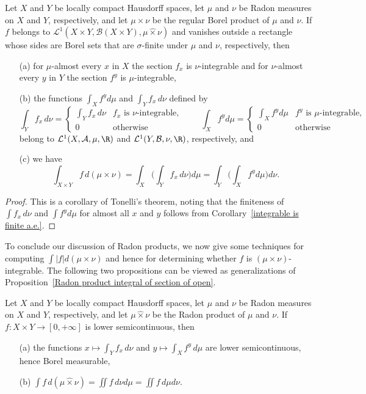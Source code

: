 \begin{proposition}
Let $X$ and $Y$ be locally compact Hausdorff spaces, let $\mu$ and $\nu$ be Radon measures on $X$ and $Y$, respectively, and let $\mu\times\nu$ be the regular Borel product of $\mu$ and $\nu$. If $f$ belongs to $\mathcal{L}^1(X\times Y,\mathcal{B}(X\times Y),\mu\hat{\times}\nu)$ and vanishes outside a rectangle whose sides are Borel sets that are $\sigma$-finite under $\mu$ and $\nu$, respectively, then
\begin{itemize}
\item[(a)] for $\mu$-almost every $x$ in $X$ the section $f_x$ is $\nu$-integrable and for $\nu$-almost every $y$ in $Y$ the section $f^y$ is $\mu$-integrable,
\item[(b)] the functions $\int_Xf^yd\mu$ and $\int_Yf_x\,d\nu$ defined by
\[\int_Yf_x\,d\nu=\begin{cases}
\int_Yf_x\,d\nu&\text{$f_x$ is $\nu$-integrable},\\[8pt]
0&\text{otherwise}
\end{cases}\quad\quad\int_Xf^yd\mu=\begin{cases}
\int_Xf^yd\mu&\text{$f^y$ is $\mu$-integrable},\\[8pt]
0&\text{otherwise}
\end{cases}\]
belong to $\mathcal{L}^1(X,\mathcal{A},\mu,\R)$ and $\mathcal{L}^1(Y,\mathcal{B},\nu,\R)$, respectively, and
\item[(c)] we have
\[\int_{X\times Y}f\,d(\mu\times\nu)=\int_X\Big(\int_Yf_x\,d\nu\Big)d\mu=\int_Y\Big(\int_Xf^yd\mu\Big)d\nu.\]
\end{itemize}
\end{proposition}
\begin{proof}
This is a corollary of Tonelli's theorem, noting that the finiteness of $\int f_x\,d\nu$ and $\int f^yd\mu$ for almost all $x$ and $y$ follows from Corollary~\ref{integrable is finite a.e.}.
\end{proof}
To conclude our discussion of Radon products, we now give some techniques for computing $\int|f|d(\mu\times\nu)$ and hence for determining whether $f$ is $(\mu\times\nu)$-integrable. The following two propositions can be viewed as generalizations of Proposition~\ref{Radon product integral of section of open}.
\begin{proposition}\label{Radon product nonnegative LSC integrable iff}
Let $X$ and $Y$ be locally compact Hausdorff spaces, let $\mu$ and $\nu$ be Radon measures on $X$ and $Y$, respectively, and let $\mu\hat{\times}\nu$ be the Radon product of $\mu$ and $\nu$. If $f:X\times Y\to[0,+\infty]$ is lower semicontinuous, then
\begin{itemize}
\item[(a)] the functions $x\mapsto\int_Yf_x\,d\nu$ and $y\mapsto\int_Xf^y\,d\mu$ are lower semicontinuous, hence Borel measurable,
\item[(b)] $\int f\,d(\mu\hat{\times}\nu)=\iint f\,d\nu d\mu=\iint f\,d\mu d\nu$.
\end{itemize}
\end{proposition}
